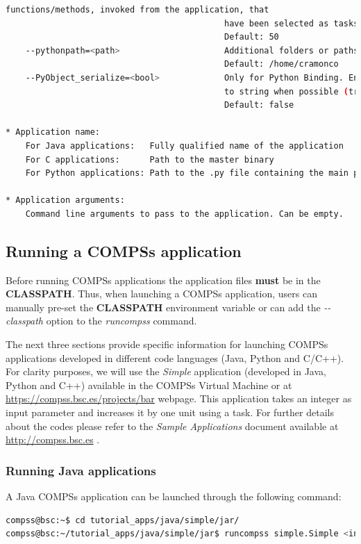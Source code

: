 \begin{lstlisting}[language=bash]
                                            functions/methods, invoked from the application, that 
                                            have been selected as tasks
                                            Default: 50
    --pythonpath=<path>                     Additional folders or paths to add to the PYTHONPATH
                                            Default: /home/cramonco
    --PyObject_serialize=<bool>             Only for Python Binding. Enable the object serialization
                                            to string when possible (true/false).
                                            Default: false

* Application name:
    For Java applications:   Fully qualified name of the application
    For C applications:      Path to the master binary
    For Python applications: Path to the .py file containing the main program

* Application arguments:
    Command line arguments to pass to the application. Can be empty.

\end{lstlisting}

\subsection{Running a COMPSs application}
\label{subsec:running_compss}
Before running COMPSs applications the application files \textbf{must} be in the \textbf{CLASSPATH}.
Thus, when launching a COMPSs application, users can manually pre-set the \textbf{CLASSPATH} environment variable
or can add the \textit{-{}-classpath} option to the \textit{runcompss} command.

The next three sections provide specific information for launching COMPSs applications developed in different code languages (Java, Python and 
C/C++). For clarity purposes, we will use the \textit{Simple} application (developed in Java, Python and C++) available in the COMPSs
Virtual Machine or at \url{https://compss.bsc.es/projects/bar} webpage. This application takes an integer as input
parameter and increases it by one unit using a task. For further details about the codes please refer to the \textit{Sample 
Applications} document available at \url{http://compss.bsc.es} .

\subsubsection{Running Java applications}
A Java COMPSs application can be launched through the following command:
\begin{lstlisting}[language=bash]
compss@bsc:~$ cd tutorial_apps/java/simple/jar/
compss@bsc:~/tutorial_apps/java/simple/jar$ runcompss simple.Simple <initial_number>
\end{lstlisting}

